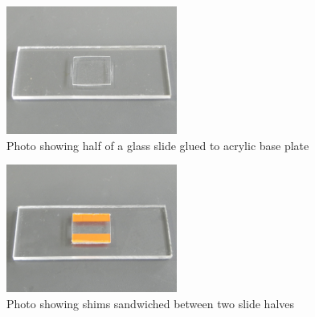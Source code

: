 \begin{figure}[p] \begin{centering}
        \includegraphics[width=0.5\textwidth]{content/pt1/01-PowerHarvesting/graphics/Photo_streamingPotential_Assembly_Step1.JPG}
        \par\end{centering}

\centering{}\protect\caption{\label{Photo_streamingPotential_Assembly_Step1}Photo
    showing half of a glass slide glued to acrylic base plate} \end{figure}
\begin{figure}[p] \begin{centering}
        \includegraphics[width=0.5\textwidth]{content/pt1/01-PowerHarvesting/graphics/Photo_streamingPotential_Assembly_Step2.JPG}
        \par\end{centering}

\centering{}\protect\caption{\label{Photo_streamingPotential_Assembly_Step2}Photo
    showing shims sandwiched between two slide halves} \end{figure}
